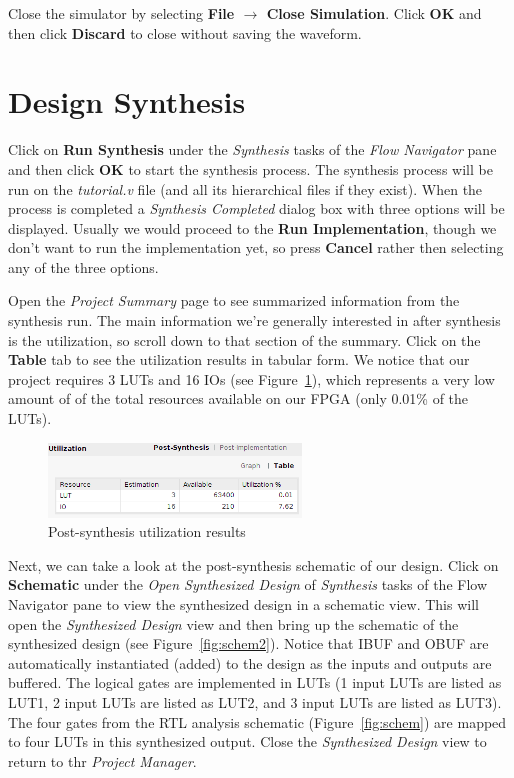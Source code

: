 \documentclass[11pt]{article}
\begin{document}
\noindent
Close the simulator by selecting \textbf{File $\rightarrow$ Close Simulation}. Click \textbf{OK} and then click \textbf{Discard} to close without saving the waveform.




\section{Design Synthesis}
\label{sec:synthesis}
Click on \textbf{Run Synthesis} under the \textit{Synthesis} tasks of the \textit{Flow Navigator} pane and then click \textbf{OK} to start the synthesis process. The synthesis process will be run on the \textit{tutorial.v} file (and all its hierarchical files if they exist). When the process is completed a \textit{Synthesis Completed} dialog box with three options will be displayed. Usually we would proceed to the \textbf{Run Implementation}, though we don't want to run the implementation yet, so press \textbf{Cancel} rather then selecting any of the three options.

Open the \textit{Project Summary} page to see summarized information from the synthesis run. The main information we're generally interested in after synthesis is the utilization, so scroll down to that section of the summary. Click on the \textbf{Table} tab to see the utilization results in tabular form. We notice that our project requires 3 LUTs and 16 IOs (see Figure~\ref{fig:util}), which represents a very low amount of of the total resources available on our FPGA (only 0.01\% of the LUTs).

\begin{figure}[!h]
    \centering
    \includegraphics[width=0.6\textwidth]{images/util.png}
    \caption{Post-synthesis utilization results}
    \label{fig:util}
\end{figure}

Next, we can take a look at the post-synthesis schematic of our design. Click on \textbf{Schematic} under the \textit{Open Synthesized Design} of \textit{Synthesis} tasks of the Flow Navigator pane to view the synthesized design in a schematic view. This will open the \textit{Synthesized Design} view and then bring up the schematic of the synthesized design (see Figure~\ref{fig:schem2}). Notice that IBUF and OBUF are automatically instantiated (added) to the design as the inputs and outputs are buffered. The logical gates are implemented in LUTs (1 input LUTs are listed as LUT1, 2 input LUTs are listed as LUT2, and 3 input LUTs are listed as LUT3). The four gates from the RTL analysis schematic (Figure~\ref{fig:schem}) are mapped to four LUTs in this synthesized output. Close the \textit{Synthesized Design} view to return to thr \textit{Project Manager}.
\newpage
\end{document}
